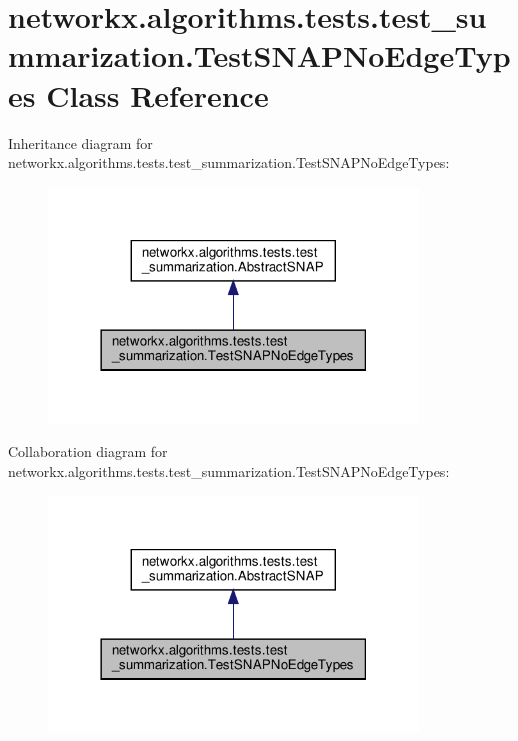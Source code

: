 \hypertarget{classnetworkx_1_1algorithms_1_1tests_1_1test__summarization_1_1TestSNAPNoEdgeTypes}{}\section{networkx.\+algorithms.\+tests.\+test\+\_\+summarization.\+Test\+S\+N\+A\+P\+No\+Edge\+Types Class Reference}
\label{classnetworkx_1_1algorithms_1_1tests_1_1test__summarization_1_1TestSNAPNoEdgeTypes}


Inheritance diagram for networkx.\+algorithms.\+tests.\+test\+\_\+summarization.\+Test\+S\+N\+A\+P\+No\+Edge\+Types\+:
\nopagebreak
\begin{figure}[H]
\begin{center}
\leavevmode
\includegraphics[width=278pt]{classnetworkx_1_1algorithms_1_1tests_1_1test__summarization_1_1TestSNAPNoEdgeTypes__inherit__graph}
\end{center}
\end{figure}


Collaboration diagram for networkx.\+algorithms.\+tests.\+test\+\_\+summarization.\+Test\+S\+N\+A\+P\+No\+Edge\+Types\+:
\nopagebreak
\begin{figure}[H]
\begin{center}
\leavevmode
\includegraphics[width=278pt]{classnetworkx_1_1algorithms_1_1tests_1_1test__summarization_1_1TestSNAPNoEdgeTypes__coll__graph}
\end{center}
\end{figure}

